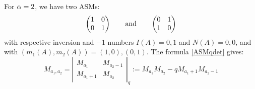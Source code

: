\begin{example}
For ${\alpha}=2$, we have two ASMs:
$$\begin{pmatrix} 1 & 0 \\ 0 & 1\end{pmatrix} \qquad {\rm and}\qquad \begin{pmatrix} 0 & 1 \\ 1 & 0\end{pmatrix}$$
with respective inversion and $-1$ numbers $I(A)=0,1$ and $N(A)=0,0$, and with $(m_1(A),m_2(A))=(1,0),(0,1)$. 
The formula \eqref{ASMqdet}  gives:
$$M_{a_1,a_2}=\left\vert \begin{matrix}M_{a_1} & M_{a_2-1}\\ M_{a_1+1} & M_{a_2}\end{matrix}\right\vert_q
:=M_{a_1}M_{a_2}-qM_{a_1+1}M_{a_2-1}$$


\end{example}
